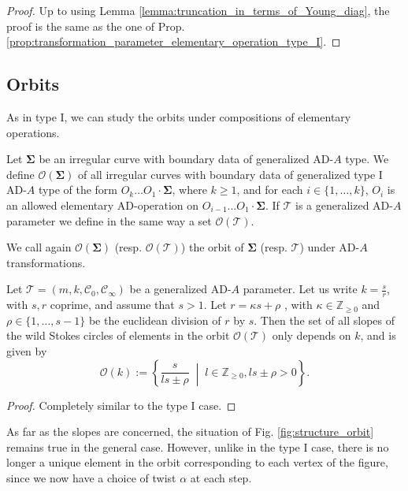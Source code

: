 \documentclass[11pt,a4paper]{amsart}
\numberwithin{equation}{section}
\begin{document}
\begin{proof}
Up to using Lemma \ref{lemma:truncation_in_terms_of_Young_diag}, the proof is the same as the one of Prop. \ref{prop:transformation_parameter_elementary_operation_type_I}.
\end{proof}

\subsection{Orbits}

As in type I, we can study the orbits under compositions of elementary operations.

\begin{definition}

Let $\bm\Sigma$ be an irregular curve with boundary data of generalized AD-$A$ type. We define $\mathcal O(\bm\Sigma)$ of all irregular curves with boundary data of generalized type I AD-$A$ type of the form $O_k\dots O_1\cdot \bm\Sigma$, where $k\geq 1$, and for each $i\in \{1, \dots, k\}$, $O_i$ is an allowed elementary AD-operation on $O_{i-1}\dots O_1\cdot \bm\Sigma$. 
If $\mathcal T$ is a generalized AD-$A$ parameter we define in the same way a set $\mathcal O(\mathcal T)$.
\end{definition}

We call again $\mathcal O(\bm\Sigma)$ (resp. $\mathcal O(\mathcal T)$) the orbit of $\bm\Sigma$ (resp. $\mathcal T$) under AD-$A$ transformations.

\begin{proposition}
Let $\mathcal T=(m, k, \mathcal C_0, \mathcal C_\infty)$ be a generalized AD-$A$ parameter. Let us write $k=\frac{s}{r}$, with $s, r$ coprime, and assume that $s>1$. Let $r=\kappa s+\rho$ , with $\kappa\in \mathbb Z_{\geq 0}$ and $\rho\in \{1, \dots, s-1\}$ be the euclidean division of $r$ by $s$. Then the set of all slopes of the wild Stokes circles of elements in the orbit $\mathcal O(\mathcal T)$ only depends on $k$, and is given by
\begin{equation}
\label{eq:form_slopes_orbit_general_case}
\mathcal O(k):=\left\lbrace \frac{s}{ls\pm \rho} \;\middle \vert\; l\in \mathbb Z_{\geq 0}, ls\pm \rho>0 \right\rbrace.
\end{equation}
\end{proposition}

\begin{proof}
Completely similar to the type I case. 
\end{proof}

\begin{remark}
As far as the slopes are concerned, the situation of Fig. \ref{fig:structure_orbit} remains true in the general case. However, unlike in the type I case, there is no longer a unique element in the orbit corresponding to each vertex of the figure, since we now have a choice of twist $\alpha$ at each step. 
\end{remark}
\end{document}

